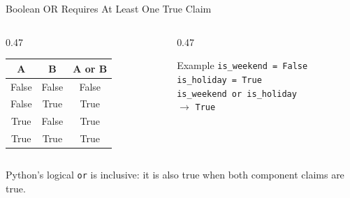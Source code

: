 \documentclass[aspectratio=169,10pt]{beamer}
\begin{document}
\begin{frame}{Boolean OR Requires At Least One True Claim}
  \begin{columns}[T,onlytextwidth]
    \begin{column}{0.47\textwidth}
      \begin{center}
        \renewcommand{\arraystretch}{1.25}
        \begin{tabular}{c|c|c}
          \textbf{A} & \textbf{B} & \textbf{A or B} \\\hline
          False & False & False \\
          False & True & True \\
          True & False & True \\
          True & True & True
        \end{tabular}
      \end{center}
    \end{column}

    \begin{column}{0.47\textwidth}
      \begin{block}{Example}
        \texttt{is\_weekend = False}\\
        \texttt{is\_holiday = True}\\[0.08in]
        \texttt{is\_weekend or is\_holiday}\\[0.08in]
        $\longrightarrow$ \texttt{True}
      \end{block}
    \end{column}
  \end{columns}

  \begin{keyidea}
    Python's logical \texttt{or} is inclusive: it is also true when both component claims are true.
  \end{keyidea}
\end{frame}
\end{document}
